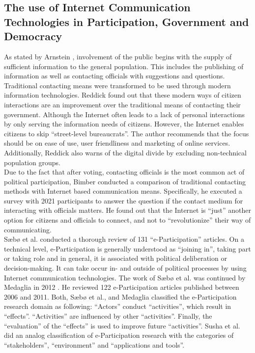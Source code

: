 \subsection{The use of Internet Communication Technologies in Participation, Government and Democracy}
As stated by Arnstein \cite{Arnstein1969_citizen_participation}, involvement of the public begins with the supply of sufficient information to the general population. This includes the publishing of information as well as contacting officials with suggestions and questions. Traditional contacting means were transformed to be used through modern information technologies. Reddick \cite{Reddick2005_Citizen_interaction_with_egovernment} found out that these modern ways of citizen interactions are an improvement over the traditional means of contacting their government. Although the Internet often leads to a lack of personal interactions by only serving the information needs of citizens. However, the Internet enables citizens to skip ``street-level bureaucrats''. The author recommends that the focus should be on ease of use, user friendliness and marketing of online services. Additionally, Reddick also warns of the digital divide by excluding non-technical population groups.\\
Due to the fact that after voting, contacting officials is the most common act of political participation, Bimber \cite{Bimber1999_Citizen_communication_with_government} conducted a comparison of traditional contacting methods with Internet based communication means. Specifically, he executed a survey with 2021 participants to answer the question if the contact medium for interacting with officials matters. He found out that the Internet is ``just'' another option for citizens and officials to connect, and not to ``revolutionize'' their way of communicating.\\
S{\ae}b{\o} et al. \cite{Saebo_eParticipation} conducted a thorough review of 131 ``e-Participation'' articles. On a technical level, e-Participation is generally understood as ``joining in'', taking part or taking role and in general, it is associated with political deliberation or decision-making. It can take occur in- and outside of political processes by using Internet communication technologies. The work of S{\ae}b{\o} et al. was continued by Medaglia in 2012 \cite{Medaglia2012_eParticipation}. He reviewed 122 e-Participation articles published between 2006 and 2011. Both, S{\ae}b{\o} et al., and Medaglia classified the e-Participation research domain as following: ``Actors'' conduct ``activities'', which result in ``effects''. ``Activities'' are influenced by other ``activities''. Finally, the ``evaluation'' of the ``effects'' is used to improve future ``activities''. Susha et al. \cite{Susha2012_eParticipation} did an analog classification of e-Participation research with the categories of ``stakeholders'', ``environment'' and ``applications and tools''.\\
